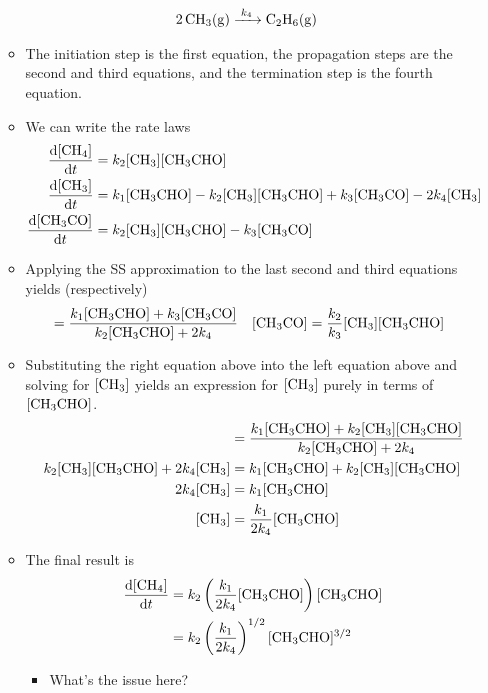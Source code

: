 \documentclass[../notes.tex]{subfiles}
\begin{document}
\begin{itemize}
\begin{itemize}
\begin{align*}
            \ce{2CH3(g)} &\ce{->[$k_4$]} \ce{C2H6(g)}
        \end{align*}
        \item The initiation step is the first equation, the propagation steps are the second and third equations, and the termination step is the fourth equation.
        \item We can write the rate laws
        \begin{align*}
            \dv{[\ce{CH4}]}{t} &= k_2[\ce{CH3}][\ce{CH3CHO}]\\
            \dv{[\ce{CH3}]}{t} &= k_1[\ce{CH3CHO}]-k_2[\ce{CH3}][\ce{CH3CHO}]+k_3[\ce{CH3CO}]-2k_4[\ce{CH3}]\\
            \dv{[\ce{CH3CO}]}{t} &= k_2[\ce{CH3}][\ce{CH3CHO}]-k_3[\ce{CH3CO}]
        \end{align*}
        \item Applying the SS approximation to the last second and third equations yields (respectively)
        \begin{align*}
            [\ce{CH3}] &= \frac{k_1[\ce{CH3CHO}]+k_3[\ce{CH3CO}]}{k_2[\ce{CH3CHO}]+2k_4}&
            [\ce{CH3CO}] &= \frac{k_2}{k_3}[\ce{CH3}][\ce{CH3CHO}]
        \end{align*}
        \item Substituting the right equation above into the left equation above and solving for $[\ce{CH3}]$ yields an expression for $[\ce{CH3}]$ purely in terms of $[\ce{CH3CHO}]$.
        \begin{align*}
            [\ce{CH3}] &= \frac{k_1[\ce{CH3CHO}]+k_2[\ce{CH3}][\ce{CH3CHO}]}{k_2[\ce{CH3CHO}]+2k_4}\\
            k_2[\ce{CH3}][\ce{CH3CHO}]+2k_4[\ce{CH3}] &= k_1[\ce{CH3CHO}]+k_2[\ce{CH3}][\ce{CH3CHO}]\\
            2k_4[\ce{CH3}] &= k_1[\ce{CH3CHO}]\\
            [\ce{CH3}] &= \frac{k_1}{2k_4}[\ce{CH3CHO}]
        \end{align*}
        \item The final result is
        \begin{align*}
            \dv{[\ce{CH4}]}{t} &= k_2\left( \frac{k_1}{2k_4}[\ce{CH3CHO}] \right)[\ce{CH3CHO}]\\
            &= k_2\left( \frac{k_1}{2k_4} \right)^{1/2}[\ce{CH3CHO}]^{3/2}
        \end{align*}
        \begin{itemize}
            \item What's the issue here?
        \end{itemize}
    \end{itemize}
\end{itemize}
\end{document}
